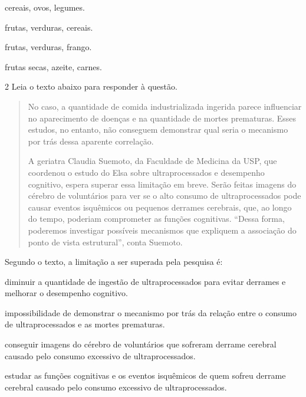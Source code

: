 \begin{escolha}
  
    \item cereais, ovos, legumes.
  
    \item frutas, verduras, cereais.
  
    \item frutas, verduras, frango.
  
    \item frutas secas, azeite, carnes.

\end{escolha}

\num{2} Leia o texto abaixo para responder à questão. 

\begin{quote}

No caso, a quantidade de comida industrializada ingerida parece
influenciar no aparecimento de doenças e na quantidade de mortes
prematuras. Esses estudos, no entanto, não conseguem demonstrar qual
seria o mecanismo por trás dessa aparente correlação.

A geriatra Claudia Suemoto, da Faculdade de Medicina da USP, que
coordenou o estudo do Elsa sobre ultraprocessados e desempenho
cognitivo, espera superar essa limitação em breve. Serão feitas imagens
do cérebro de voluntários para ver se o alto consumo de ultraprocessados
pode causar eventos isquêmicos ou pequenos derrames cerebrais, que, ao
longo do tempo, poderiam comprometer as funções cognitivas. ``Dessa
forma, poderemos investigar possíveis mecanismos que expliquem a
associação do ponto de vista estrutural'', conta Suemoto.

\end{quote}

\pagebreak

Segundo o texto, a limitação a ser superada pela pesquisa é:

\begin{escolha}

    \item diminuir a quantidade de ingestão de ultraprocessados para evitar derrames e melhorar o desempenho cognitivo.

    \item impossibilidade de demonstrar o mecanismo por trás da relação entre o consumo de ultraprocessados e as mortes prematuras.
  
    \item conseguir imagens do cérebro de voluntários que sofreram derrame cerebral causado pelo consumo excessivo de ultraprocessados.
  
    \item estudar as funções cognitivas e os eventos isquêmicos de quem sofreu derrame cerebral causado pelo consumo excessivo de ultraprocessados.

\end{escolha}

